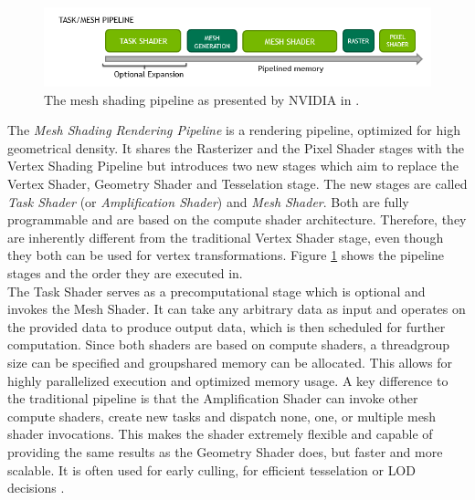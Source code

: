 \begin{figure}[h]
    \centering
    \includegraphics[width=\linewidth]{images/graphics/mesh-rendering-pipeline.png}
    \caption{The mesh shading pipeline as presented by NVIDIA in \cite{Kubisch2018}.}
    \label{fig:mesh-rendering-pipeline}
\end{figure}

\noindent
The \emph{Mesh Shading Rendering Pipeline} is a rendering pipeline, optimized for high geometrical 
density. It shares the Rasterizer and the Pixel Shader stages with the Vertex Shading Pipeline but 
introduces two new stages which aim to replace the Vertex Shader, Geometry Shader and Tesselation stage.
The new stages are called \emph{Task Shader} (or \emph{Amplification Shader}) and \emph{Mesh Shader}. Both 
are fully programmable and are based on the compute shader architecture. Therefore, they are inherently different 
from the traditional Vertex Shader stage, even though they both can be used for vertex transformations.
Figure \ref{fig:mesh-rendering-pipeline} shows the pipeline stages and the order they are executed in. \\

\noindent
The Task Shader serves as a precomputational stage which is optional and invokes the Mesh Shader.
It can take any arbitrary data as input and operates on the provided data to produce output data, which is then 
scheduled for further computation. Since both shaders are based on compute shaders, a threadgroup size can be 
specified  and groupshared memory can be allocated. This allows for highly parallelized execution and optimized 
memory usage. A key difference to the traditional pipeline is that the Amplification Shader can invoke other 
compute shaders, create new tasks and dispatch none, one, or multiple mesh shader invocations. This makes the 
shader extremely flexible and capable of providing the same results as the Geometry Shader does, but faster and 
more scalable. It is often used for early culling, for efficient tesselation or \ac{LOD} decisions \cite{Kubisch2018}. \\


